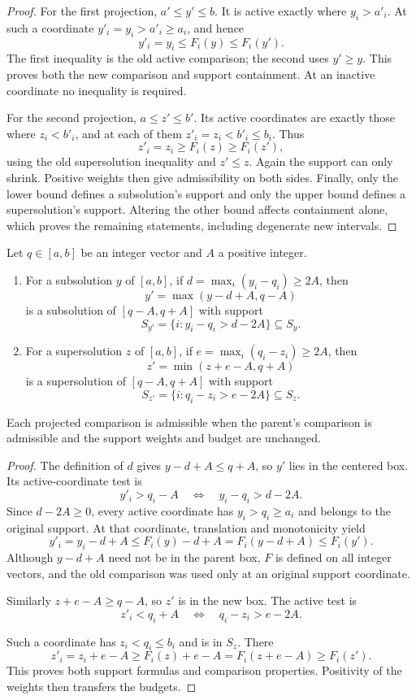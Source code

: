 \begin{proof}
For the first projection, $a'\le y'\le b$. It is active exactly where
$y_i>a'_i$. At such a coordinate $y'_i=y_i>a'_i\ge a_i$, and hence
\[
 y'_i=y_i\le F_i(y)\le F_i(y').
\]
The first inequality is the old active comparison; the second uses
$y'\ge y$. This proves both the new comparison and support containment.
At an inactive coordinate no inequality is required.

For the second projection, $a\le z'\le b'$. Its active coordinates are
exactly those where $z_i<b'_i$, and at each of them $z'_i=z_i<b'_i\le b_i$.
Thus
\[
 z'_i=z_i\ge F_i(z)\ge F_i(z'),
\]
using the old supersolution inequality and $z'\le z$. Again the support
can only shrink. Positive weights then give admissibility on both sides.
Finally, only the lower bound defines a subsolution's support and only
the upper bound defines a supersolution's support. Altering the other
bound affects containment alone, which proves the remaining statements,
including degenerate new intervals.
\end{proof}

\begin{lemma}\label{lem:center-projections}
Let $q\in[a,b]$ be an integer vector and $A$ a positive integer.
\begin{enumerate}[label=\textup{(\roman*)}]
\item For a subsolution $y$ of $[a,b]$, if
$d=\max_i(y_i-q_i)\ge2A$, then
\[
 y'=\max(y-d+A,q-A)
\]
is a subsolution of $[q-A,q+A]$ with support
\[
 S_{y'}=\{i:y_i-q_i>d-2A\}\subseteq S_y.
\]
\item For a supersolution $z$ of $[a,b]$, if
$e=\max_i(q_i-z_i)\ge2A$, then
\[
 z'=\min(z+e-A,q+A)
\]
is a supersolution of $[q-A,q+A]$ with support
\[
 S_{z'}=\{i:q_i-z_i>e-2A\}\subseteq S_z.
\]
\end{enumerate}
Each projected comparison is admissible when the parent's comparison
is admissible and the support weights and budget are unchanged.
\end{lemma}

\begin{proof}
The definition of $d$ gives $y-d+A\le q+A$, so $y'$ lies in the
centered box. Its active-coordinate test is
\[
 y'_i>q_i-A\quad\Longleftrightarrow\quad y_i-q_i>d-2A.
\]
Since $d-2A\ge0$, every active coordinate has $y_i>q_i\ge a_i$ and
belongs to the original support. At that coordinate, translation and
monotonicity yield
\[
 y'_i=y_i-d+A\le F_i(y)-d+A
       =F_i(y-d+A)\le F_i(y').
\]
Although $y-d+A$ need not be in the parent box, $F$ is defined on all
integer vectors, and the old comparison was used only at an original
support coordinate.

\begin{samepage}
Similarly $z+e-A\ge q-A$, so $z'$ is in the new box. The active test is
\[
 z'_i<q_i+A\quad\Longleftrightarrow\quad q_i-z_i>e-2A.
\]
\end{samepage}
Such a coordinate has $z_i<q_i\le b_i$ and is in $S_z$. There
\[
 z'_i=z_i+e-A\ge F_i(z)+e-A
       =F_i(z+e-A)\ge F_i(z').
\]
This proves both support formulas and comparison properties. Positivity
of the weights then transfers the budgets.
\end{proof}

